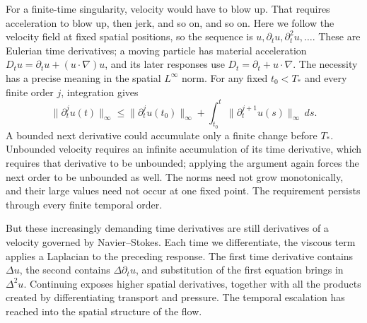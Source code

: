 For a finite-time singularity, velocity would have to blow up. That requires
acceleration to blow up, then jerk, and so on, and so on. Here we follow the
velocity field at fixed spatial positions, so the sequence is
\(u,\partial_tu,\partial_t^2u,\ldots\). These are Eulerian time derivatives;
a moving particle has material acceleration
\(D_tu=\partial_tu+(u\cdot\nabla)u\), and its later responses use
\(D_t=\partial_t+u\cdot\nabla\).
The necessity has a precise meaning in the spatial \(L^\infty\) norm.
For any fixed \(t_0<T_*\) and every finite order \(j\), integration gives
\[
 \|\partial_t^ju(t)\|_\infty
 \le \|\partial_t^ju(t_0)\|_\infty
 +\int_{t_0}^{t}\|\partial_t^{j+1}u(s)\|_\infty\,ds.
\]
A bounded next derivative could accumulate only a finite change before
\(T_*\). Unbounded velocity requires an infinite accumulation of its time
derivative, which requires that derivative to be unbounded; applying the
argument again forces the next order to be unbounded as well. The norms
need not grow monotonically, and their large values need not occur at one
fixed point. The requirement persists through every finite temporal order.

But these increasingly demanding time derivatives are still derivatives of
a velocity governed by Navier--Stokes. Each time we differentiate, the
viscous term applies a Laplacian to the preceding response. The first time
derivative contains \(\Delta u\), the second contains
\(\Delta\partial_tu\), and substitution of the first equation brings in
\(\Delta^2u\). Continuing exposes higher spatial derivatives, together
with all the products created by differentiating transport and pressure.
The temporal escalation has reached into the spatial structure of the flow.

